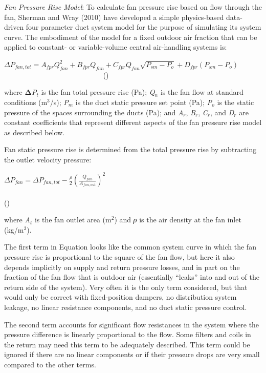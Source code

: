 \emph{Fan Pressure Rise Model}: To calculate fan pressure rise based on flow through the fan, Sherman and Wray (2010) have developed a simple physics-based data-driven four parameter duct system model for the purpose of simulating its system curve. The embodiment of the model for a fixed outdoor air fraction that can be applied to constant- or variable-volume central air-handling systems is:

\(\Delta {P_{fan,tot}} = {A_{fpr}}Q_{fan}^2 + {B_{fpr}}Q_{fan}^{} + {C_{fpr}}Q_{fan}^{}\sqrt {{P_{sm}} - {P_o}} + {D_{fpr}}\left( {{P_{sm}} - {P_o}} \right)\) ~~~~~~~~~~~~~~~~~~~~~~~~~~~ ()

where \textbf{Δ}\emph{P\(_{t}\)} is the fan total pressure rise (Pa); \emph{Q\(_{n}\)} is the fan flow at standard conditions (m\(^{3}\)/s); \emph{P\(_{m}\)} is the duct static pressure set point (Pa); \emph{P\(_{o}\)} is the static pressure of the spaces surrounding the ducts (Pa); and \emph{A\(_{r}\)}, \emph{B\(_{r}\)}, \emph{C\(_{r}\)}, and \emph{D\(_{r}\)} are constant coefficients that represent different aspects of the fan pressure rise model as described below.

Fan static pressure rise is determined from the total pressure rise by subtracting the outlet velocity pressure:

\(\Delta {P_{fan}} = \Delta {P_{fan,tot}} - \frac{\rho }{2}{\left( {\frac{{{Q_{fan}}}}{{{A_{fan,out}}}}} \right)^2}\) ~~~~~~~~~~~~~~~~~~~~~~~~~~~~~~~~~~~~~~~~~~~~~~~~~~~~~~~~~~~~~~~~~~~~~~~~ ()

where \emph{A\(_{t}\)} is the fan outlet area (m\(^{2}\)) and \emph{ρ} is the air density at the fan inlet (kg/m\(^{3}\)).

The first term in Equation looks like the common system curve in which the fan pressure rise is proportional to the square of the fan flow, but here it also depends implicitly on supply and return pressure losses, and in part on the fraction of the fan flow that is outdoor air (essentially ``leaks'' into and out of the return side of the system). Very often it is the only term considered, but that would only be correct with fixed-position dampers, no distribution system leakage, no linear resistance components, and no duct static pressure control.

The second term accounts for significant flow resistances in the system where the pressure difference is linearly proportional to the flow. Some filters and coils in the return may need this term to be adequately described. This term could be ignored if there are no linear components or if their pressure drops are very small compared to the other terms.

